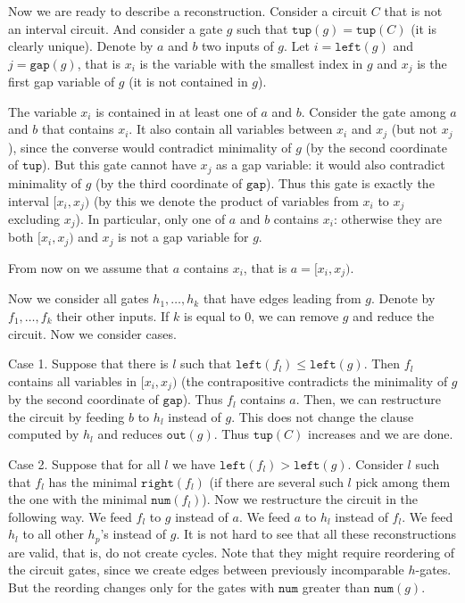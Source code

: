 \documentclass[11pt,letterpaper]{article}
\newcommand{\lef}{\texttt{left}}
\newcommand{\righ}{\texttt{right}}
\newcommand{\gap}{\texttt{gap}}
\newcommand{\num}{\texttt{num}}
\newcommand{\out}{\texttt{out}}
\newcommand{\tup}{\texttt{tup}}
\begin{document}
Now we are ready to describe a reconstruction. Consider a circuit $C$ that is not an interval circuit. And consider a gate $g$ such that $\tup(g)=\tup(C)$ (it is clearly unique). Denote by $a$ and $b$ two inputs of $g$. Let $i=\lef(g)$ and $j=\gap(g)$, that is $x_i$ is the variable with the smallest index in $g$ and $x_j$ is the first gap variable of $g$ (it is not contained in $g$).

The variable $x_i$ is contained in at least one of $a$ and $b$. Consider the gate among $a$ and $b$ that contains $x_i$. It also contain all variables between $x_i$ and $x_j$ (but not $x_j$), since the converse would contradict minimality of $g$ (by the second coordinate of $\tup$). But this gate cannot have $x_j$ as a gap variable: it would also contradict minimality of $g$ (by the third coordinate of $\gap$). Thus this gate is exactly the interval $[x_i,x_j)$ (by this we denote the product of variables from $x_i$ to $x_j$ excluding $x_j$). In particular, only one of $a$ and $b$ contains $x_i$: otherwise they are both $[x_i,x_j)$ and $x_j$ is not a gap variable for $g$. 

From now on we assume that $a$ contains $x_i$, that is $a=[x_i,x_j)$. 

Now we consider all gates $h_1,\ldots, h_k$ that have edges leading from $g$. Denote by $f_1,\ldots, f_k$ their other inputs. If $k$ is equal to $0$, we can remove $g$ and reduce the circuit. Now we consider cases.

Case 1. Suppose that there is $l$ such that $\lef(f_l) \leq \lef(g)$. Then $f_l$ contains all variables in $[x_i,x_j)$ (the contrapositive contradicts the minimality of $g$ by the second coordinate of $\gap$). Thus $f_l$ contains $a$. Then, we can restructure the circuit by feeding $b$ to $h_l$ instead of $g$. This does not change the clause computed by $h_l$ and reduces $\out(g)$. Thus $\tup(C)$ increases and we are done.

Case 2. Suppose that for all $l$ we have $\lef(f_l)>\lef(g)$. Consider $l$ such that $f_l$ has the minimal $\righ(f_l)$ (if there are several such $l$ pick among them the one with the minimal $\num(f_l)$). Now we restructure the circuit in the following way. We feed $f_l$ to $g$ instead of $a$. We feed $a$ to $h_l$ instead of $f_l$. We feed $h_l$ to all other $h_p$'s instead of $g$. It is not hard to see that all these reconstructions are valid, that is, do not create cycles. Note that they might require reordering of the circuit gates, since we create edges between previously incomparable $h$-gates. But the reording changes only for the gates with $\num$ greater than $\num(g)$. 
\end{document}

